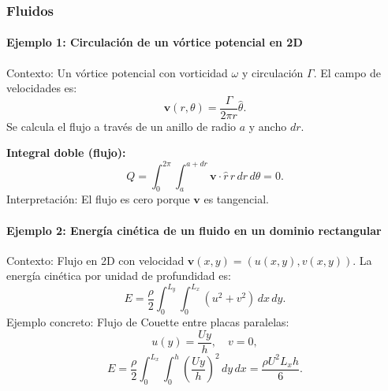 \documentclass[11pt]{book}
\theoremstyle{definicion}
\theoremstyle{teorema}
\theoremstyle{ejemplo}
\begin{document}
\subsubsection{Fluidos}

\paragraph{Ejemplo 1: Circulación de un vórtice potencial en 2D} 
Contexto: Un vórtice potencial con vorticidad \( \omega \) y circulación \( \Gamma \). El campo de velocidades es:
\[
\mathbf{v}(r, \theta) = \frac{\Gamma}{2\pi r} \hat{\theta}.
\]
Se calcula el flujo a través de un anillo de radio \( a \) y ancho \( dr \).

\medskip

\noindent \textbf{Integral doble (flujo):}
\[
Q = \int_{0}^{2\pi} \int_{a}^{a + dr} \mathbf{v} \cdot \hat{r} \, r \, dr \, d\theta = 0.
\]
Interpretación: El flujo es cero porque \( \mathbf{v} \) es tangencial.


\paragraph{Ejemplo 2: Energía cinética de un fluido en un dominio rectangular}
Contexto: Flujo en 2D con velocidad \( \mathbf{v}(x,y) = (u(x,y), v(x,y)) \). La energía cinética por unidad de profundidad es:
\[
E = \frac{\rho}{2} \int_{0}^{L_y} \int_{0}^{L_x} (u^2 + v^2) \, dx \, dy.
\]
Ejemplo concreto: Flujo de Couette entre placas paralelas:
\[
u(y) = \frac{U y}{h}, \quad v = 0,
\]
\[
E = \frac{\rho}{2} \int_{0}^{L_x} \int_{0}^{h} \left( \frac{U y}{h} \right)^2 \, dy \, dx = \frac{\rho U^2 L_x h}{6}.
\]




%
%
%
\end{document}
